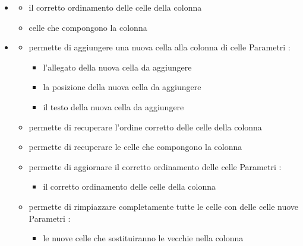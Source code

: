 \begin{itemize}
\item {}
\begin{itemize}
\item {}
\newline
il corretto ordinamento delle celle della colonna
\item {}
\newline
celle che compongono la colonna
\end{itemize}
\item {}
\begin{itemize}
\item {}
\newline
permette di aggiungere una nuova cella alla colonna di celle
\newline
Parametri :
\begin{itemize}
\item {}
\newline
l'allegato della nuova cella da aggiungere
\item {}
\newline
la posizione della nuova cella da aggiungere
\item {}
\newline
il testo della nuova cella da aggiungere
\end{itemize}
\item {}
\newline
permette di recuperare l'ordine corretto delle celle della colonna
\newline
\item {}
\newline
permette di recuperare le celle che compongono la colonna
\newline
\item {}
\newline
permette di aggiornare il corretto ordinamento delle celle
\newline
Parametri :
\begin{itemize}
\item {}
\newline
il corretto ordinamento delle celle della colonna
\end{itemize}
\item {}
\newline
permette di rimpiazzare completamente tutte le celle con delle celle nuove
\newline
Parametri :
\begin{itemize}
\item {}
\newline
le nuove celle che sostituiranno le vecchie nella colonna
\end{itemize}
\end{itemize}
\end{itemize}
